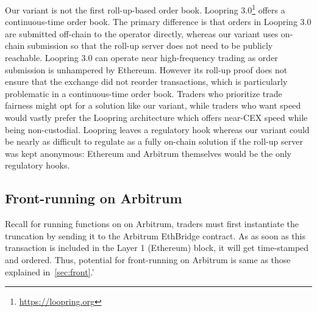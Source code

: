  
Our \cm variant is not the first roll-up-based order book. Loopring 3.0\footnote{\url{https://loopring.org}} offers a continuous-time order book. The primary difference is that orders in Loopring 3.0 are submitted off-chain to the operator directly, whereas our variant uses on-chain submission so that the roll-up server does not need to be publicly reachable. Loopring 3.0 can operate near high-frequency trading as order submission is unhampered by Ethereum. However its  roll-up proof does not ensure that the exchange did not reorder transactions, which is particularly problematic in a continuous-time order book. Traders who prioritize trade fairness might opt for a solution like our variant, while traders who want speed would vastly prefer the Loopring architecture which offers near-CEX speed while being non-custodial. Loopring leaves a regulatory hook whereas our variant could be nearly as difficult to regulate as a fully on-chain solution if the roll-up server was kept anonymous: Ethereum and Arbitrum themselves would be the only regulatory hooks. 
 
 
	
\subsection{Front-running on Arbitrum}

Recall for running functions on \cm on Arbitrum, traders must first instantiate the truncation by sending it to the Arbitrum EthBridge contract. As as soon as this transaction is included in the Layer 1 (Ethereum) block, it will get time-stamped and ordered. Thus, potential for front-running on Arbitrum is same as those explained in~\ref{sec:front}.'






